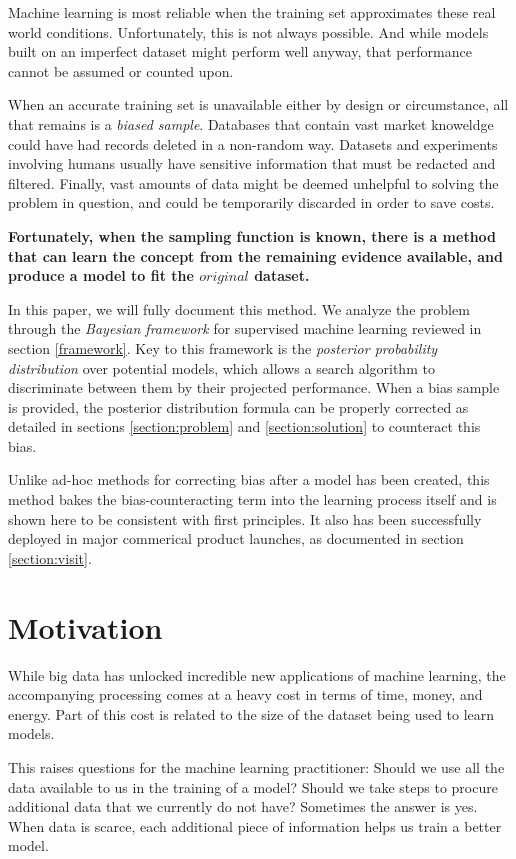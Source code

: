 \documentclass[twoside]{article}
\begin{document}
Machine learning is most reliable when the training set approximates these real world conditions. Unfortunately, this is not always possible. And while models built on an imperfect dataset might perform well anyway, that performance cannot be assumed or counted upon.

When an accurate training set is unavailable either by design or circumstance, all that remains is a \textit{biased sample}. Databases that contain vast market knoweldge could have had records deleted in a non-random way. Datasets and experiments involving humans usually have sensitive information that must be redacted and filtered. Finally, vast amounts of data might be deemed unhelpful to solving the problem in question, and could be temporarily discarded in order to save costs.

\textbf{Fortunately, when the sampling function is known, there is a method that can learn the concept from the remaining evidence available, and produce a model to fit the \(original\) dataset.}

In this paper, we will fully document this method. We analyze the problem through the \textit{Bayesian framework} for supervised machine learning reviewed in section \ref{framework}. Key to this framework is the \textit{posterior probability distribution} over potential models, which allows a search algorithm to discriminate between them by their projected performance. When a bias sample is provided, the posterior distribution formula can be properly corrected as detailed in sections \ref{section:problem} and \ref{section:solution} to counteract this bias.

Unlike ad-hoc methods for correcting bias after a model has been created, this method bakes the bias-counteracting term into the learning process itself and is shown here to be consistent with first principles. It also has been successfully deployed in major commerical product launches, as documented in section \ref{section:visit}.

\section{Motivation}

While big data has unlocked incredible new applications of machine learning, the accompanying processing comes at a heavy cost in terms of time, money, and energy. Part of this cost is related to the size of the dataset being used to learn models.

This raises questions for the machine learning practitioner: Should we use all the data available to us in the training of a model? Should we take steps to procure additional data that we currently do not have? Sometimes the answer is yes. When data is scarce, each additional piece of information helps us train a better model.
\end{document}
